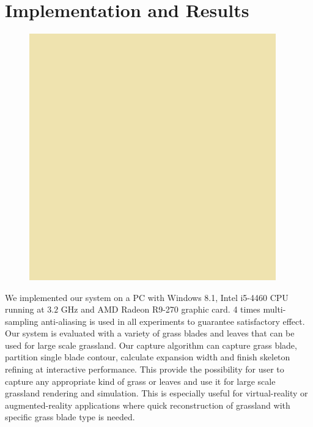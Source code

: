 \documentclass[10pt,journal,compsoc]{IEEEtran}
\begin{document}
\section{Implementation and Results}
\begin{figure}
    \centering
    \includegraphics[width=0.95\textwidth]{figs/test3.jpg}
    \label{fig:results}
\end{figure}

We implemented our system on a PC with Windows 8.1, Intel i5-4460 CPU running at $3.2$ GHz and AMD Radeon R9-270 graphic card. 4 times multi-sampling anti-aliasing is used in all experiments to guarantee satisfactory effect.\\

Our system is evaluated with a variety of grass blades and leaves that can be used for large scale grassland. Our capture algorithm can capture grass blade, partition single blade contour, calculate expansion width and finish skeleton refining at interactive performance. This provide the possibility for user to capture any appropriate kind of grass or leaves and use it for large scale grassland rendering and simulation. This is especially useful for virtual-reality or augmented-reality applications where quick reconstruction of grassland with specific grass blade type is needed. \\
\end{document}
